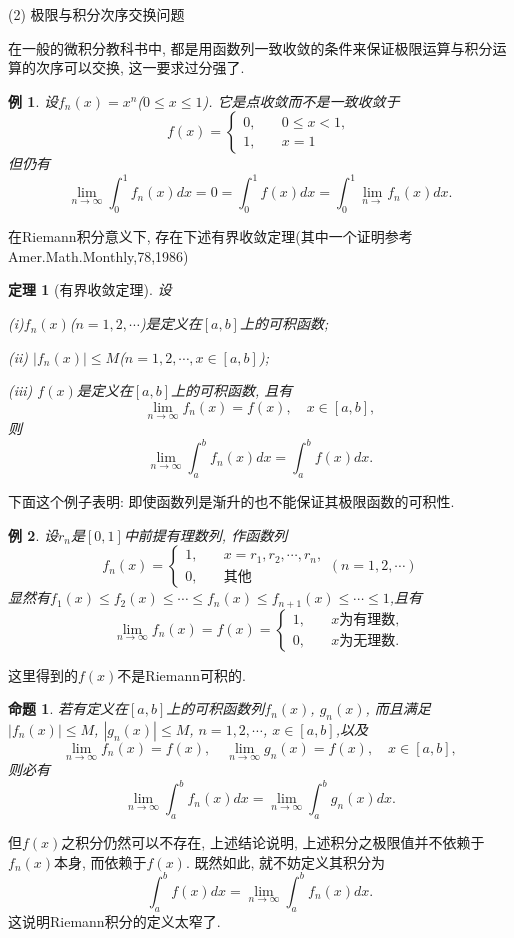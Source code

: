 \documentclass[12pt,a4paper,openany]{book}
\newtheorem{example}{例}
\newtheorem{theorem}{定理}[section]
\newtheorem{proposition}{命题}[section]
\begin{document}
(2) 极限与积分次序交换问题

在一般的微积分教科书中, 都是用函数列一致收敛的条件来保证极限运算与积分运算的次序可以交换, 这一要求过分强了.

\begin{example}
设$f_n(x) = x^n$($0 \le x \le 1$). 它是点收敛而不是一致收敛于
$$
f(x) = \left\{
\begin{aligned}
0, &\quad 0 \le x < 1, \\
1, &\quad x = 1
\end{aligned}
\right.
$$
但仍有
$$
\lim_{n \rightarrow \infty}{\int_{0}^{1}{f_n(x)dx}} = 0 = \int_{0}^{1}{f(x)dx} = \int_{0}^{1}{\lim_{n \rightarrow}{f_n(x)}dx}.
$$
\end{example}

在Riemann积分意义下, 存在下述有界收敛定理(其中一个证明参考Amer.Math.Monthly,78,1986)
\begin{theorem}[有界收敛定理]
设

(i)$f_n(x)$($n=1,2,\cdots$)是定义在$[a, b]$上的可积函数;

(ii) $|f_n(x)| \le M$($n = 1, 2, \cdots, x \in [a, b]$);

(iii) $f(x)$是定义在$[a, b]$上的可积函数, 且有
$$
\lim_{n \rightarrow \infty}{f_n(x)} = f(x), \quad x \in [a, b],
$$
则
$$
\lim_{n \rightarrow \infty}{\int_{a}^{b}{f_n(x)dx}} = \int_{a}^{b}{f(x)dx}.
$$
\end{theorem}

下面这个例子表明: 即使函数列是渐升的也不能保证其极限函数的可积性.

\begin{example}
设$r_n$是$[0, 1]$中前提有理数列, 作函数列
$$
f_n(x) = \left\{
\begin{aligned}
1, \quad & x = r_1, r_2, \cdots, r_n, \\
0, \quad & \text{其他}
\end{aligned}
\right.
(n = 1, 2, \cdots)
$$
显然有$f_1(x) \le f_2(x) \le \cdots \le f_n(x) \le f_{n+1}(x) \le \cdots \le 1$,且有
$$
\lim_{n \rightarrow \infty}{f_n(x)} = f(x) = \left\{
\begin{aligned}
1, \quad & x\text{为有理数}, \\
0, \quad & x\text{为无理数}.
\end{aligned}
\right.
$$
\end{example}

这里得到的$f(x)$不是Riemann可积的.

\begin{proposition}
若有定义在$[a, b]$上的可积函数列$f_n(x)$, $g_n(x)$, 而且满足$|f_n(x)| \le M$, $|g_n(x)| \le M$, $n=1, 2, \cdots$, $x \in [a, b]$,以及
$$
\lim_{n \rightarrow \infty}{f_n(x)} = f(x), \quad \lim_{n \rightarrow \infty}{g_n(x)} = f(x), \quad x \in [a, b],
$$
则必有
$$
\lim_{n \rightarrow \infty}{\int_{a}^{b}{f_n(x)dx}} = \lim_{n \rightarrow \infty}{\int_{a}^{b}{g_n(x)dx}}.
$$
\end{proposition}
但$f(x)$之积分仍然可以不存在, 上述结论说明, 上述积分之极限值并不依赖于$f_n(x)$本身, 而依赖于$f(x)$. 既然如此, 就不妨定义其积分为
$$
\int_{a}^{b}{f(x)dx} = \lim_{n \rightarrow \infty}{\int_{a}^{b}{f_n(x)dx}}.
$$
这说明Riemann积分的定义太窄了.
\end{document}
